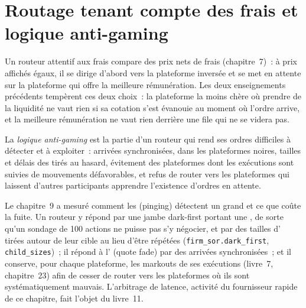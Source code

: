 \section{Routage tenant compte des frais et logique anti-gaming}

Un routeur attentif aux frais compare des prix nets de frais (chapitre~7)~: à prix affichés égaux, il se dirige d'abord vers la plateforme inversée et se met en attente sur la plateforme qui offre
la meilleure rémunération. Les deux enseignements précédents tempèrent ces deux choix~: la plateforme la moins chère où prendre de la liquidité ne vaut rien si sa cotation s'est évanouie au moment où l'ordre
arrive, et la meilleure rémunération ne vaut rien derrière une file qui ne se videra pas.

\begin{definition}\label{def:mx:smart-order-routing:antigaming}
La \emph{logique anti-gaming} est la partie d'un routeur qui rend ses ordres difficiles à détecter et à exploiter~: arrivées synchronisées,
 dans les plateformes noires, tailles et délais des  tirés au hasard, évitement des plateformes dont les exécutions sont suivies de mouvements défavorables, et refus de router
vers les plateformes qui laissent d'autres participants apprendre l'existence d'ordres en attente.
\end{definition}

Le chapitre~9 a mesuré comment les  (pinging) détectent un grand  et ce que coûte la fuite. Un routeur y répond par une jambe dark-first portant une , de sorte qu'un sondage de 100 actions ne puisse pas s'y négocier, et par des tailles d' tirées autour de leur cible au lieu d'être répétées
(\texttt{firm\_sor.dark\_first}, \texttt{child\_sizes})~; il répond à l' (quote fade) par des arrivées synchronisées~; et il conserve, pour chaque plateforme, les markouts de ses
exécutions (livre~7, chapitre~23) afin de cesser de router vers les plateformes où ils sont systématiquement mauvais. L'arbitrage de latence, activité du fournisseur rapide de ce chapitre,
fait l'objet du livre~11.


